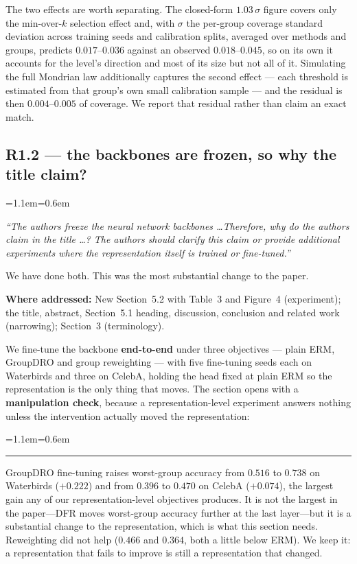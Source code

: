 \documentclass[11pt,a4paper]{article}
\newenvironment{reviewer}
  {\begin{list}{}{\leftmargin=1.1em\rightmargin=0.6em}\item[]\itshape\color{revgrey}\small}
  {\end{list}}
\newenvironment{revised}
  {\begin{list}{}{\leftmargin=1.1em\rightmargin=0.6em}\item[]%
   \color{black}\small\hspace{-1.1em}\textcolor{quoterule}{\rule[-0.4ex]{2pt}{1.05em}}\hspace{0.5em}\ignorespaces}
  {\end{list}}
\newcommand{\where}[1]{{\textbf{Where addressed:} #1\par}}
\newcommand{\rpoint}[2]{\subsection*{#1 --- #2}}
\begin{document}
The two effects are worth separating. The closed-form $1.03\,\sigma$ figure covers only the
min-over-$k$ selection effect and, with $\sigma$ the per-group coverage standard deviation across
training seeds and calibration splits, averaged over methods and groups, predicts
$0.017$--$0.036$ against an observed
$0.018$--$0.045$, so on its own it accounts for the level's direction and most of its size but not
all of it. Simulating the full Mondrian law additionally captures the second effect --- each threshold is
estimated from that group's own small calibration sample --- and the residual is then
$0.004$--$0.005$ of coverage. We report that residual rather than claim an exact match.

\rpoint{R1.2}{the backbones are frozen, so why the title claim?}

\begin{reviewer}
``The authors freeze the neural network backbones \ldots Therefore, why do the authors claim in the
title \ldots? The authors should clarify this claim or provide additional experiments where the
representation itself is trained or fine-tuned.''
\end{reviewer}

We have done both. This was the most substantial change to the paper.

\where{New Section~5.2 with Table~3 and Figure~4 (experiment); the title, abstract, Section~5.1 heading,
discussion, conclusion and related work (narrowing); Section~3 (terminology).}

We fine-tune the backbone \textbf{end-to-end} under three objectives --- plain ERM, GroupDRO and
group reweighting --- with five fine-tuning seeds each on Waterbirds and three on CelebA, holding
the head fixed at plain ERM so the
representation is the only thing that moves. The section opens with a \textbf{manipulation check},
because a representation-level experiment answers nothing unless the intervention actually moved
the representation:

\begin{revised}
GroupDRO fine-tuning raises worst-group accuracy from $0.516$ to $0.738$ on Waterbirds
($+0.222$) and from $0.396$ to $0.470$ on CelebA ($+0.074$), the largest gain any of our
representation-level objectives produces. It is not the largest in the paper---DFR moves worst-group
accuracy further at the last layer---but it is a substantial change to the representation, which is
what this section needs. Reweighting did not help ($0.466$ and $0.364$, both a little below ERM).
We keep it: a representation that fails to improve is still a representation that changed.
\end{revised}
\end{document}

